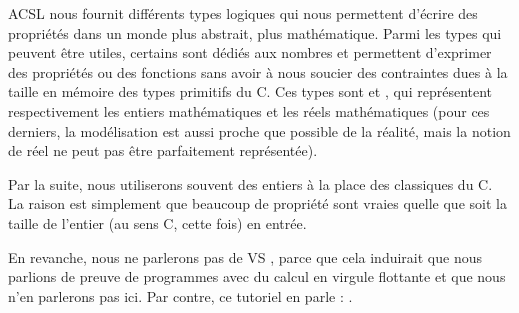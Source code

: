 ACSL nous fournit différents types logiques qui nous permettent d'écrire des
propriétés dans un monde plus abstrait, plus mathématique. Parmi les types qui
peuvent être utiles, certains sont dédiés aux nombres et permettent d'exprimer
des propriétés ou des fonctions sans avoir à nous soucier des contraintes dues
à la taille en mémoire des types primitifs du C. Ces types sont 
et , qui représentent respectivement les entiers mathématiques et
les réels mathématiques (pour ces derniers, la modélisation est aussi proche que
possible de la réalité, mais la notion de réel ne peut pas être parfaitement
représentée).



Par la suite, nous utiliserons souvent des entiers à la place des classiques
 du C. La raison est simplement que beaucoup de propriété sont vraies
quelle que soit la taille de l'entier (au sens C, cette fois) en entrée.



En revanche, nous ne parlerons pas de  VS , parce que
cela induirait que nous parlions de preuve de programmes avec du calcul en virgule
flottante et que nous n'en parlerons pas ici. Par contre, ce tutoriel en parle :
.
